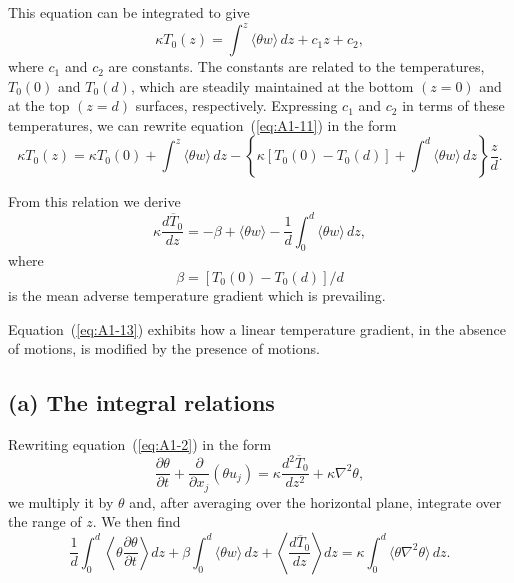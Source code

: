 This equation can be integrated to give
\begin{equation}
\label{eq:A1-11}
\kappa T_0(z) = \int^z \langle \theta w \rangle \, dz + c_1 z + c_2,
\end{equation}
where $c_1$ and $c_2$ are constants. The constants are related to the temperatures, $T_0(0)$ and $T_0(d)$, which are steadily maintained at the bottom $(z = 0)$ and at the top $(z = d)$ surfaces, respectively. Expressing $c_1$ and $c_2$ in terms of these temperatures, we can rewrite equation~(\ref{eq:A1-11}) in the form
\begin{equation}
\label{eq:A1-12}
\kappa T_0(z) = \kappa T_0(0) + \int^z \langle \theta w \rangle \, dz - \left\{ \kappa [T_0(0) - T_0(d)] + \int^d \langle \theta w \rangle \, dz \right\} \frac{z}{d}.
\end{equation}

From this relation we derive
\begin{equation}
\label{eq:A1-13}
\kappa \frac{d\overline{T}_0}{dz} = -\beta + \langle \theta w \rangle - \frac{1}{d} \int_0^d \langle \theta w \rangle \, dz,
\end{equation}
where
\begin{equation}
\label{eq:A1-14}
\beta = [T_0(0) - T_0(d)] / d
\end{equation}
is the mean adverse temperature gradient which is prevailing.

Equation~(\ref{eq:A1-13}) exhibits how a linear temperature gradient, in the absence of motions, is modified by the presence of motions.

\subsection*{(a) The integral relations}

Rewriting equation~(\ref{eq:A1-2}) in the form
\begin{equation}
\label{eq:A1-15}
\frac{\partial \theta}{\partial t} + \frac{\partial}{\partial x_j}(\theta u_j) = \kappa \frac{d^2\overline{T}_0}{dz^2} + \kappa \nabla^2 \theta,
\end{equation}
we multiply it by $\theta$ and, after averaging over the horizontal plane, integrate over the range of $z$. We then find
\begin{equation}
\label{eq:A1-16}
\frac{1}{d} \int_0^d \left\langle \theta \frac{\partial \theta}{\partial t} \right\rangle dz + \beta \int_0^d \langle \theta w \rangle \, dz + \left\langle \frac{d\overline{T}_0}{dz} \right\rangle dz = \kappa \int_0^d \langle \theta \nabla^2 \theta \rangle \, dz.
\end{equation}

